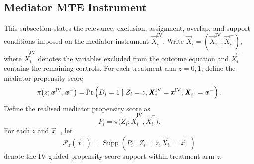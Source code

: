 \subsection{Mediator MTE Instrument}
\label{appendix:mte-iv}

This subsection states the relevance, exclusion, assignment, overlap, and support conditions imposed on the mediator instrument $\vec X_i^{\mathrm{IV}}$.
Write $\vec X_i=(\vec X_i^{\mathrm{IV}},\vec X_i^-)$, where $\vec X_i^{\mathrm{IV}}$ denotes the variables excluded from the outcome equation and $\vec X_i^-$ contains the remaining controls.
For each treatment arm $z=0,1$, define the mediator propensity score
\[
    \pi\big(z;\boldsymbol{\mathit{x}}^{\mathrm{IV}},\boldsymbol{\mathit{x}}^-\big)
    =
    \Pr\left( 
        D_i=1
        \mid
        Z_i=z,
        \boldsymbol{\mathit{X}}_i^{\mathrm{IV}}=\boldsymbol{\mathit{x}}^{\mathrm{IV}},
        \boldsymbol{\mathit{X}}_i^-=\boldsymbol{\mathit{x}}^-
     \right).
\]
Define the realised mediator propensity score as
\[
    P_i
    =
    \pi\big(
        Z_i;
        \vec X_i^{\mathrm{IV}},
        \vec X_i^-
    \big).
\]
For each $z$ and $\vec x^-$, let
\[
    \mathcal P_z(\vec x^-)
    =
    \operatorname{Supp}
    \left(
        P_i
        \mid
        Z_i=z,
        \vec X_i^-=\vec x^-
    \right)
\]
denote the IV-guided propensity-score support within treatment arm $z$.

